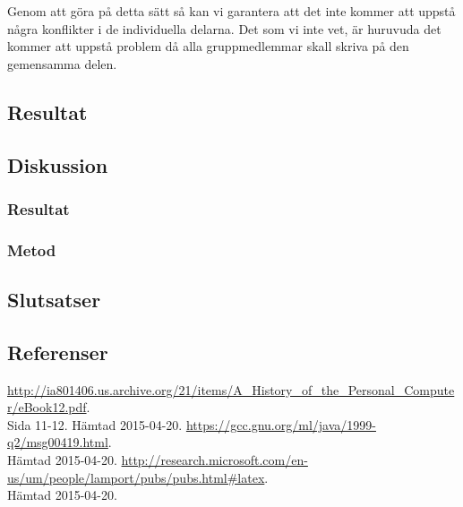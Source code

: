Genom att göra på detta sätt så kan vi garantera att det inte kommer att uppstå några konflikter i de individuella delarna.
Det som vi inte vet, är huruvuda det kommer att uppstå problem då alla gruppmedlemmar skall skriva på den gemensamma delen.

\subsection{Resultat}
\subsection{Diskussion}
\subsubsection{Resultat}
\subsubsection{Metod}
\subsection{Slutsatser}
\subsection{Referenser}
\begin{thebibliography}{9}
\url{http://ia801406.us.archive.org/21/items/A\_History\_of\_the\_Personal\_Computer/eBook12.pdf}.\\
 Sida 11-12. Hämtad 2015-04-20.
\url{https://gcc.gnu.org/ml/java/1999-q2/msg00419.html}.\\
 Hämtad 2015-04-20.
\url{http://research.microsoft.com/en-us/um/people/lamport/pubs/pubs.html#latex}.\\
 Hämtad 2015-04-20.
 
\end{thebibliography}
